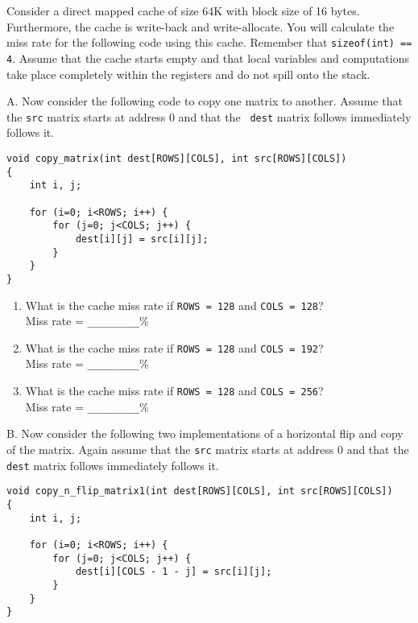 \begin{problem}{14}

Consider a direct mapped cache of size 64K with block size of 16 bytes.
Furthermore, the cache is write-back and write-allocate.  You will
calculate the miss rate for the following code using this cache.
Remember that {\tt sizeof(int) == 4}.  Assume that the cache starts
empty and that local variables and computations take place completely
within the registers and do not spill onto the stack.

\end{problem}

A. Now consider the following code to copy one matrix to another.
Assume that the {\tt src} matrix starts at address 0 and that the {\tt
dest} matrix follows immediately follows it.

{\small\begin{verbatim}
void copy_matrix(int dest[ROWS][COLS], int src[ROWS][COLS])
{
    int i, j;

    for (i=0; i<ROWS; i++) {
        for (j=0; j<COLS; j++) {
            dest[i][j] = src[i][j];
        }
    }
}
\end{verbatim}}

\begin{enumerate}
\item What is the cache miss rate if {\tt ROWS = 128} and {\tt COLS = 128}?\\
Miss rate = \verb|_________|\% 
\item What is the cache miss rate if {\tt ROWS = 128} and {\tt COLS = 192}?\\
Miss rate = \verb|_________|\% 
\item What is the cache miss rate if {\tt ROWS = 128} and {\tt COLS = 256}?\\
Miss rate = \verb|_________|\% 
\end{enumerate}


\newpage
B. Now consider the following two implementations of a horizontal
flip and copy of the matrix.  Again assume that the {\tt src} matrix
starts at address 0 and that the {\tt dest} matrix follows immediately
follows it.

{\small\begin{verbatim}
void copy_n_flip_matrix1(int dest[ROWS][COLS], int src[ROWS][COLS])
{
    int i, j;

    for (i=0; i<ROWS; i++) {
        for (j=0; j<COLS; j++) {
            dest[i][COLS - 1 - j] = src[i][j];
        }
    }
}
\end{verbatim}}

